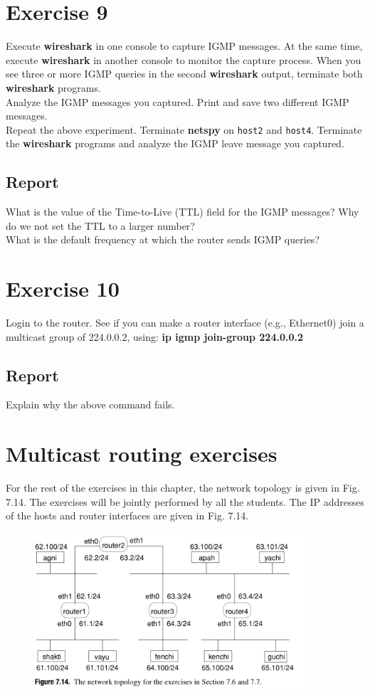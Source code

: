 \documentclass[10pt,a4paper]{article}
\numberwithin{equation}{section}
\numberwithin{figure}{section}
\numberwithin{table}{section}
\begin{document}
    \section{ Exercise 9}
    Execute \textbf{wireshark} in one console to capture IGMP messages.
    At the same time, execute \textbf{wireshark} in another console to monitor the capture process.
    When you see three or more IGMP queries in the second \textbf{wireshark} output, terminate both \textbf{wireshark} programs. \\
    Analyze the IGMP messages you captured.
    Print and save two different IGMP messages. \\
    Repeat the above experiment.
    Terminate \textbf{netspy} on \texttt{host2} and \texttt{host4}.
    Terminate the \textbf{wireshark} programs and analyze the IGMP leave message you captured.
    \subsection*{Report}
    What is the value of the Time-to-Live (TTL) field for the IGMP messages?
    Why do we not set the TTL to a larger number? \\
    What is the default frequency at which the router sends IGMP queries?

    \section{ Exercise 10}
    Login to the router.
    See if you can make a router interface (e.g., Ethernet0) join a multicast group of 224.0.0.2, using:
    \textbf{ip igmp join-group 224.0.0.2}
    \subsection*{Report}
    Explain why the above command fails.

    \section*{Multicast routing exercises}
    For the rest of the exercises in this chapter, the network topology is given in Fig. 7.14. The exercises will be jointly performed by all the students. The IP addresses of the hosts and router interfaces are given in Fig. 7.14.
    \begin{figure}[H]
        \centering
        \includegraphics[width=0.9\textwidth]{img/figure7-14.png}
    \end{figure}
\end{document}
